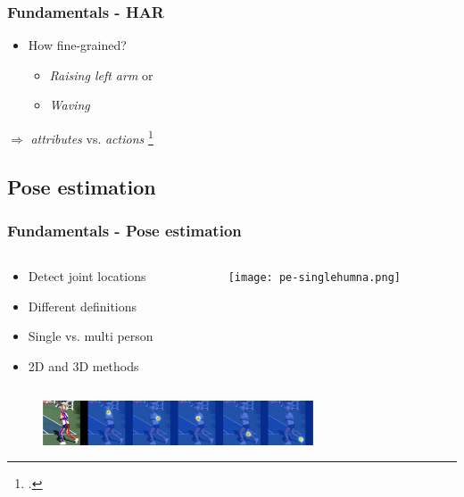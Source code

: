 \documentclass[9pt]{beamer}
\providecommand{\fcite}[1]{\footcite{#1}}
\newenvironment{myframe}[1][]{%
\begin{frame}%
\frametitle{#1}
\setcounter{footnote}{0}


}{%
\end{frame}%
}
\begin{document}
\begin{myframe}[Fundamentals - HAR]
    \begin{itemize}
        \item How fine-grained?
        \begin{itemize}
            \item \textit{Raising left arm} or
            \item \textit{Waving}
        \end{itemize}
    \end{itemize}
    $\Rightarrow$ \textit{attributes} vs. \textit{actions} \fcite{reining_towards_2018}
\end{myframe}

\subsection{Pose estimation}

\begin{myframe}[Fundamentals - Pose estimation]
    \begin{columns}[T]
        \begin{column}{0.45\textwidth}
            \vspace{30px}
            \begin{itemize}
                \item Detect joint locations
                \item Different definitions
                \item Single vs. multi person
                \item 2D and 3D methods
            \end{itemize}
        \end{column}
        \begin{column}{0.55\textwidth}
            \begin{figure}
                \texttt{[image: pe-singlehumna.png]}
            \end{figure}
        \end{column}
    \end{columns}
    \begin{figure}
        \includegraphics[height=50px]{2dheatmaps.png}
    \end{figure}
\end{myframe}
\end{document}
